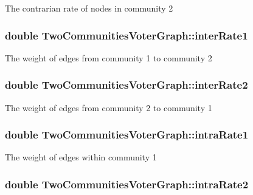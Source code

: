 The contrarian rate of nodes in community 2 \hypertarget{class_two_communities_voter_graph_af08c3b9a6e6f1dc8659a38ecd2d1afde}{
\subsubsection[{inter\-Rate1}]{\setlength{\rightskip}{0pt plus 5cm}double Two\-Communities\-Voter\-Graph\-::inter\-Rate1}}\label{class_two_communities_voter_graph_af08c3b9a6e6f1dc8659a38ecd2d1afde}
The weight of edges from community 1 to community 2 \hypertarget{class_two_communities_voter_graph_afab8bb5994f7fd1370d7d81caf7277d4}{
\subsubsection[{inter\-Rate2}]{\setlength{\rightskip}{0pt plus 5cm}double Two\-Communities\-Voter\-Graph\-::inter\-Rate2}}\label{class_two_communities_voter_graph_afab8bb5994f7fd1370d7d81caf7277d4}
The weight of edges from community 2 to community 1 \hypertarget{class_two_communities_voter_graph_a96a32ba7529177a7f6b73e827a57791e}{
\subsubsection[{intra\-Rate1}]{\setlength{\rightskip}{0pt plus 5cm}double Two\-Communities\-Voter\-Graph\-::intra\-Rate1}}\label{class_two_communities_voter_graph_a96a32ba7529177a7f6b73e827a57791e}
The weight of edges within community 1 \hypertarget{class_two_communities_voter_graph_a6e7ea06e014d75b7bf18441885e07e1e}{
\subsubsection[{intra\-Rate2}]{\setlength{\rightskip}{0pt plus 5cm}double Two\-Communities\-Voter\-Graph\-::intra\-Rate2}}\label{class_two_communities_voter_graph_a6e7ea06e014d75b7bf18441885e07e1e}
